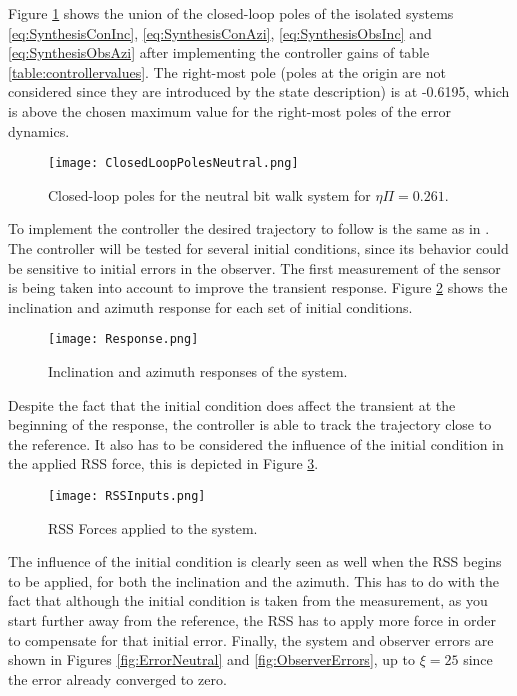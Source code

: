 \documentclass[main.tex]{subfiles}
\begin{document}
Figure \ref{fig:ClosedLoopPolesNeutral} shows the union of the closed-loop poles of the isolated systems \eqref{eq:SynthesisConInc}, \eqref{eq:SynthesisConAzi}, \eqref{eq:SynthesisObsInc} and \eqref{eq:SynthesisObsAzi} after implementing the controller gains of table \ref{table:controllervalues}. The right-most pole (poles at the origin are not considered since they are introduced by the state description) is at -0.6195, which is above the chosen maximum value for the right-most poles of the error dynamics.

\begin{figure}[h]\centering
	\texttt{[image: ClosedLoopPolesNeutral.png]}
	\caption{Closed-loop poles for the neutral bit walk system for $\eta \Pi = 0.261$.
		\label{fig:ClosedLoopPolesNeutral} }
\end{figure}


To implement the controller the desired trajectory to follow is the same as in \cite{Monsieurs2015}. The controller will be tested for several initial conditions, since its behavior could be sensitive to initial errors in the observer. The first measurement of the sensor is being taken into account to improve the transient response. Figure \ref{fig:Resoponse} shows the inclination and azimuth response for each set of initial conditions.

\begin{figure}[H]\centering
	\texttt{[image: Response.png]}
	\caption{Inclination and azimuth responses of the system.
		\label{fig:Resoponse} }
\end{figure}


Despite the fact that the initial condition does affect the transient at the beginning of the response, the controller is able to track the trajectory close to the reference. It also has to be considered the influence of the initial condition in the applied RSS force, this is depicted in Figure \ref{fig:RSSForces}.

\begin{figure}[H]\centering
	\texttt{[image: RSSInputs.png]}
	\caption{RSS Forces applied to the system.
		\label{fig:RSSForces} }
\end{figure}

The influence of the initial condition is clearly seen as well when the RSS begins to be applied, for both the inclination and the azimuth. This has to do with the fact that although the initial condition is taken from the measurement, as you start further away from the reference, the RSS has to apply more force in order to compensate for that initial error. Finally, the system and observer errors are shown in Figures \ref{fig:ErrorNeutral} and \ref{fig:ObserverErrors}, up to $\xi = 25$ since the error already converged to zero. 
\end{document}
